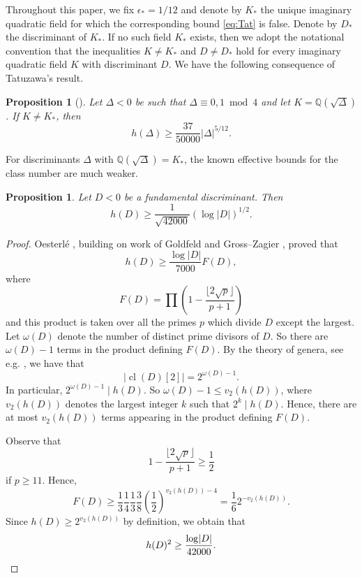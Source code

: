 \documentclass[11pt,a4paper, british]{amsart}
\newtheorem{prop}[thm]{Proposition}
\theoremstyle{definition}
\theoremstyle{remark}
\numberwithin{equation}{section}
\newcommand{\Q}{\mathbb{Q}} %
\DeclareMathOperator{\cl}{cl} %
\begin{document}
Throughout this paper, we fix $\epsilon_* = 1/12$ and denote by $K_*$ the unique imaginary quadratic field for which the corresponding bound \eqref{eq:Tat} is false. Denote by $D_*$ the discriminant of $K_*$. If no such field $K_*$ exists, then we adopt the notational convention that the inequalities $K \neq K_*$ and $D \neq D_*$ hold for every imaginary quadratic field $K$ with discriminant $D$. We have the following consequence of Tatuzawa's result.

\begin{prop}[{\cite[(17)]{BiluKuhne20}}]\label{prop:Tatbd}
	Let $\Delta < 0$ be such that $\Delta \equiv 0, 1 \bmod 4$ and let $K = \Q(\sqrt{\Delta})$. If $K \neq K_*$, then
	\[ h(\Delta) \geq \frac{37}{50000} \lvert \Delta \rvert^{5/12}.\]
\end{prop}



For discriminants $\Delta$ with $\Q(\sqrt{\Delta}) = K_*$, the known effective bounds for the class number are much weaker.

\begin{prop}\label{prop:fundbd}
	Let $D < 0$ be a fundamental discriminant. Then
	\[ h(D) \geq \frac{1}{\sqrt{42000}} (\log \lvert D \rvert)^{1/2}.\]
\end{prop}

\begin{proof}
	Oesterl\'{e} \cite[Th\'{e}or\`{e}me~1 \& \S5.1]{Oesterle85}, building on work of Goldfeld \cite{Goldfeld76} and Gross--Zagier \cite[Theorem~8.1]{GrossZagier86}, proved  that
	\[ h(D) \geq \frac{\log \lvert D \rvert}{7000} F(D),\]
	where
	\[ F(D) = \prod \left( 1 - \frac{\lfloor 2 \sqrt{p} \rfloor}{p+1}\right)\]
	and this product is taken over all the primes $p$ which divide $D$ except the largest. Let $\omega(D)$ denote the number of distinct prime divisors of $D$. So there are $\omega(D) - 1$ terms in the product defining $F(D)$. By the theory of genera, see e.g. \cite[Proposition~3.11 \& Theorem~6.1]{Cox22}, we have that
	\[ \lvert \cl(D)[2] \rvert = 2^{\omega(D) -1}.\]
	In particular, $2^{\omega(D) -1} \mid h(D)$. So $\omega(D) - 1 \leq v_2(h(D))$, where $ v_2(h(D))$ denotes the largest integer $k$ such that $2^k \mid h(D)$. Hence, there are at most $v_2(h(D))$ terms appearing in the product defining $F(D)$. 
	
	Observe that
	\[ 1 - \frac{\lfloor 2 \sqrt{p} \rfloor}{p+1} \geq \frac{1}{2}\]
	if $p \geq 11$. Hence,
	\[F(D) \geq \frac{1}{3} \frac{1}{4} \frac{1}{3} \frac{3}{8} \left(\frac{1}{2}\right)^{v_2(h(D)) - 4} = \frac{1}{6} 2^{-v_2(h(D))}.\]
	Since $h(D) \geq 2^{v_2(h(D))}$ by definition, we obtain that
	\[ h(D)^2 \geq \frac{\log \lvert D \rvert}{42000}. \qedhere\]
	
\end{proof}
\end{document}
